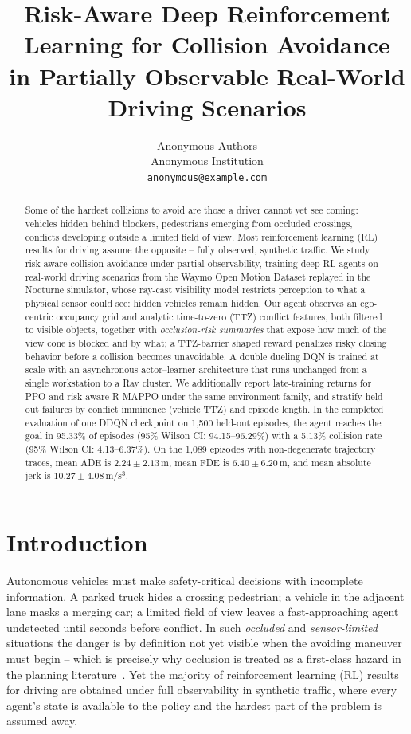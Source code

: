 \documentclass{article}
\title{\textbf{Risk-Aware Deep Reinforcement Learning for Collision Avoidance\\
in Partially Observable Real-World Driving Scenarios}}
\author{%
  Anonymous Authors\\
  Anonymous Institution\\
  \texttt{anonymous@example.com}
}
\date{}
\begin{document}
\maketitle

\begin{abstract}
Some of the hardest collisions to avoid are those a driver cannot yet see
coming: vehicles hidden behind blockers, pedestrians emerging from occluded
crossings, conflicts developing outside a limited field of view. Most
reinforcement learning (RL) results for driving assume the opposite --
fully observed, synthetic traffic. We study risk-aware collision avoidance
under partial observability, training deep RL agents on real-world driving
scenarios from the Waymo Open Motion Dataset replayed in the Nocturne
simulator, whose ray-cast visibility model restricts perception to what a
physical sensor could see: hidden vehicles remain hidden. Our agent
observes an ego-centric occupancy grid and analytic time-to-zero (TTZ)
conflict features, both filtered to visible objects, together with
\emph{occlusion-risk summaries} that expose how much of the view cone is
blocked and by what; a TTZ-barrier shaped reward penalizes risky closing
behavior before a collision becomes unavoidable. A double dueling DQN is
trained at scale with an asynchronous actor--learner architecture that runs
unchanged from a single workstation to a Ray cluster. We additionally report
late-training returns for PPO and risk-aware R-MAPPO under the same
environment family, and stratify held-out failures by conflict imminence
(vehicle TTZ) and episode length. In the completed evaluation of one DDQN
checkpoint on 1{,}500 held-out episodes, the agent reaches the goal in
95.33\% of episodes (95\% Wilson CI: 94.15--96.29\%) with a 5.13\%
collision rate (95\% Wilson CI: 4.13--6.37\%). On the 1{,}089 episodes with
non-degenerate trajectory traces, mean ADE is $2.24 \pm 2.13$\,m, mean FDE
is $6.40 \pm 6.20$\,m, and mean absolute jerk is
$10.27 \pm 4.08$\,m/s$^3$.
\end{abstract}

\section{Introduction}
\label{sec:introduction}

Autonomous vehicles must make safety-critical decisions with incomplete
information. A parked truck hides a crossing pedestrian; a vehicle in the
adjacent lane masks a merging car; a limited field of view leaves a
fast-approaching agent undetected until seconds before conflict. In such
\emph{occluded} and \emph{sensor-limited} situations the danger is by
definition not yet visible when the avoiding maneuver must begin -- which is
precisely why occlusion is treated as a first-class hazard in the planning
literature~\citep{orzechowski2018tackling, bouton2018scalable}. Yet the
majority of reinforcement learning (RL) results for driving are obtained
under full observability in synthetic traffic, where every agent's state is
available to the policy and the hardest part of the problem is assumed away.
\end{document}
